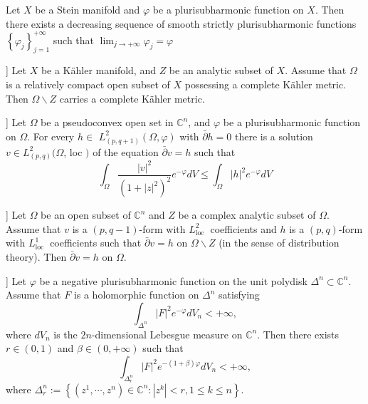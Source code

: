 \documentclass[lang=en,12pt]{beautybook}
\begin{document}
\begin{lemma}
  Let $X$ be a Stein manifold and $\varphi$ be a plurisubharmonic function on $X$. Then there exists a decreasing sequence of smooth strictly plurisubharmonic functions $\left\{\varphi_j\right\}_{j=1}^{+\infty}$ such that $\lim _{j \rightarrow+\infty} \varphi_j=\varphi$
\end{lemma}

\begin{lemma}[][Theorem 1.5 in [9]]
  Let $X$ be a Kähler manifold, and $Z$ be an analytic subset of $X$. Assume that $\Omega$ is a relatively compact open subset of $X$ possessing a complete Kähler metric. Then $\Omega \backslash Z$ carries a complete Kähler metric.
\end{lemma}

\begin{lemma}[][Theorem 4.4.2 in [19]]
  Let $\Omega$ be a pseudoconvex open set in $\mathbb{C}^n$, and $\varphi$ be a plurisubharmonic function on $\Omega$. For every $h \in$ $L_{(p, q+1)}^2(\Omega, \varphi)$ with $\bar{\partial} h=0$ there is a solution $v \in L_{(p, q)}^2(\Omega$, loc $)$ of the equation $\bar{\partial} v=h$ such that
$$
\int_{\Omega} \frac{|v|^2}{\left(1+|z|^2\right)^2} e^{-\varphi} d V \leq \int_{\Omega}|h|^2 e^{-\varphi} d V
$$
\end{lemma}

\begin{lemma}[][Lemma 6.9 in [9]]
  Let $\Omega$ be an open subset of $\mathbb{C}^n$ and $Z$ be a complex analytic subset of $\Omega$. Assume that $v$ is a $(p, q-1)$-form with $L_{\text {loc }}^2$ coefficients and $h$ is a $(p, q)$-form with $L_{\text {loc }}^1$ coefficients such that $\bar{\partial} v=h$ on $\Omega \backslash Z$ (in the sense of distribution theory). Then $\bar{\partial} v=h$ on $\Omega$.
\end{lemma}

\begin{lemma}[][strong openness conjecture, see [17]]
  Let $\varphi$ be a negative plurisubharmonic function on the unit polydisk $\Delta^n \subset \mathbb{C}^n$. Assume that $F$ is a holomorphic function on $\Delta^n$ satisfying
  $$
  \int_{\Delta^n}|F|^2 e^{-\varphi} d V_n<+\infty,
  $$
  where $d V_n$ is the $2 n$-dimensional Lebesgue measure on $\mathbb{C}^n$. Then there exists $r \in(0,1)$ and $\beta \in(0,+\infty)$ such that
  $$
  \int_{\Delta_r^n}|F|^2 e^{-(1+\beta) \varphi} d V_n<+\infty,
  $$
  where $\Delta_r^n:=\left\{\left(z^1, \cdots, z^n\right) \in \mathbb{C}^n:\left|z^k\right|<r, 1 \leq k \leq n\right\}$.
\end{lemma}
\end{document}
